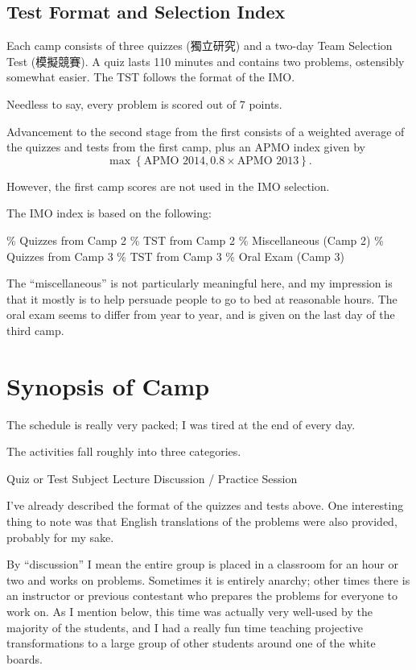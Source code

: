 \documentclass[11pt]{scrreprt}
\begin{document}
\subsection{Test Format and Selection Index}
Each camp consists of three quizzes (獨立研究) and a two-day Team Selection Test (模擬競賽).
A quiz lasts 110 minutes and contains two problems, ostensibly somewhat easier.
The TST follows the format of the IMO.

Needless to say, every problem is scored out of 7 points.

Advancement to the second stage from the first consists of a weighted average of
the quizzes and tests from the first camp, plus an APMO index given by
\[ \max \left\{ \text{APMO 2014}, 0.8 \times \text{APMO 2013} \right\}. \]

However, the first camp scores are not used in the IMO selection.

The IMO index is based on the following:
\begin{itemize}
  \% Quizzes from Camp 2
  \% TST from Camp 2
  \% Miscellaneous (Camp 2)
  \% Quizzes from Camp 3
  \% TST from Camp 3
  \% Oral Exam (Camp 3)
\end{itemize}
The ``miscellaneous'' is not particularly meaningful here,
and my impression is that it mostly is to help persuade people to go to bed at reasonable hours.
The oral exam seems to differ from year to year, and is given on the last day of the third camp.


\section{Synopsis of Camp}
The schedule is really very packed; I was tired at the end of every day.

The activities fall roughly into three categories.
\begin{itemize}
  \ii Quiz or Test
  \ii Subject Lecture
  \ii Discussion / Practice Session
\end{itemize}

I've already described the format of the quizzes and tests above.
One interesting thing to note was that English translations of the problems were also provided,
probably for my sake.

By ``discussion'' I mean the entire group is placed in a classroom for an hour or two and works on problems.
Sometimes it is entirely anarchy;
other times there is an instructor or previous contestant who prepares the problems for everyone to work on.
As I mention below, this time was actually very well-used by the majority of the students,
and I had a really fun time teaching projective transformations to a large group
of other students around one of the white boards.
\end{document}
